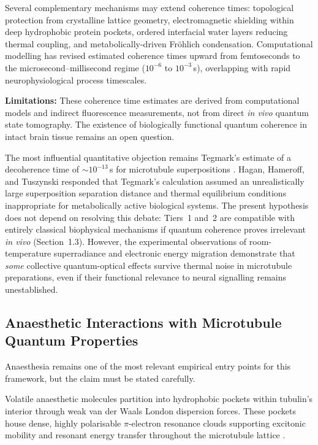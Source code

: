 \documentclass[10pt, a4paper, twocolumn]{article}
\begin{document}
Several complementary mechanisms may extend coherence times: topological
protection from crystalline lattice geometry, electromagnetic shielding
within deep hydrophobic protein pockets, ordered interfacial water
layers reducing thermal coupling, and metabolically-driven Fr\"ohlich
condensation. Computational modelling has revised estimated coherence
times upward from femtoseconds to the microsecond--millisecond regime
($10^{-6}$ to $10^{-3}$\,s), overlapping with rapid neurophysiological
process timescales.

\textbf{Limitations:} These coherence time estimates are derived from
computational models and indirect fluorescence measurements, not from
direct \emph{in vivo} quantum state tomography. The existence of
biologically functional quantum coherence in intact brain tissue remains
an open question.

The most influential quantitative objection remains Tegmark's
estimate of a decoherence time of $\sim 10^{-13}$\,s for
microtubule superpositions \cite{tegmark2000}. Hagan, Hameroff,
and Tuszynski \cite{hagan2002} responded that Tegmark's
calculation assumed an unrealistically large superposition
separation distance and thermal equilibrium conditions
inappropriate for metabolically active biological systems.
The present hypothesis does not depend on resolving this
debate: Tiers~1 and~2 are compatible with entirely classical
biophysical mechanisms if quantum coherence proves irrelevant
\emph{in vivo} (Section~1.3). However, the experimental
observations of room-temperature superradiance
\cite{babcock2024} and electronic energy migration
\cite{kalra2023} demonstrate that \emph{some} collective
quantum-optical effects survive thermal noise in microtubule
preparations, even if their functional relevance to neural
signalling remains unestablished.

\subsection{Anaesthetic Interactions with Microtubule Quantum
Properties}

Anaesthesia remains one of the most relevant empirical entry points for
this framework, but the claim must be stated carefully.

Volatile anaesthetic molecules partition into hydrophobic pockets within
tubulin's interior through weak van der Waals London dispersion forces.
These pockets house dense, highly polarisable $\pi$-electron resonance
clouds supporting excitonic mobility and resonant energy transfer
throughout the microtubule lattice \cite{craddock2017}.
\end{document}
